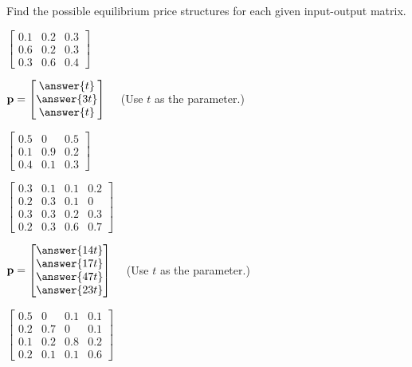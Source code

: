 \documentclass{ximera}
\begin{document}
\begin{problem}
Find the possible equilibrium price structures for each given input-output matrix.
\begin{problem}\label{prob:i/o_1}

$\begin{bmatrix}
0.1 & 0.2 & 0.3 \\
0.6 & 0.2 & 0.3 \\
0.3 & 0.6 & 0.4
\end{bmatrix}$

${\bf p}=\begin{bmatrix}
\answer{t} \\
\answer{3t} \\
\answer{t}
\end{bmatrix} \quad$ (Use $t$ as the parameter.)
\end{problem}

\begin{problem}\label{prob:i/o_2}
$\begin{bmatrix}
0.5 & 0 & 0.5 \\
0.1 & 0.9 & 0.2 \\
0.4 & 0.1 & 0.3
\end{bmatrix}$
\end{problem}

\begin{problem}\label{prob:i/o_3}
$\begin{bmatrix}
0.3 & 0.1 & 0.1 & 0.2 \\
0.2 & 0.3 & 0.1 & 0 \\
0.3 & 0.3 & 0.2 & 0.3 \\
0.2 & 0.3 & 0.6 & 0.7
\end{bmatrix}$

${\bf p}=\begin{bmatrix}
\answer{14t} \\
\answer{17t} \\
\answer{47t} \\
\answer{23t}
\end{bmatrix} \quad$ (Use $t$ as the parameter.)
\end{problem}



\begin{problem}\label{prob:i/o_4}
$\begin{bmatrix}
0.5 & 0 & 0.1 & 0.1 \\
0.2 & 0.7 & 0 & 0.1 \\
0.1 & 0.2 & 0.8 & 0.2 \\
0.2 & 0.1 & 0.1 & 0.6
\end{bmatrix}$
\end{problem}

\end{problem}
\end{document}
